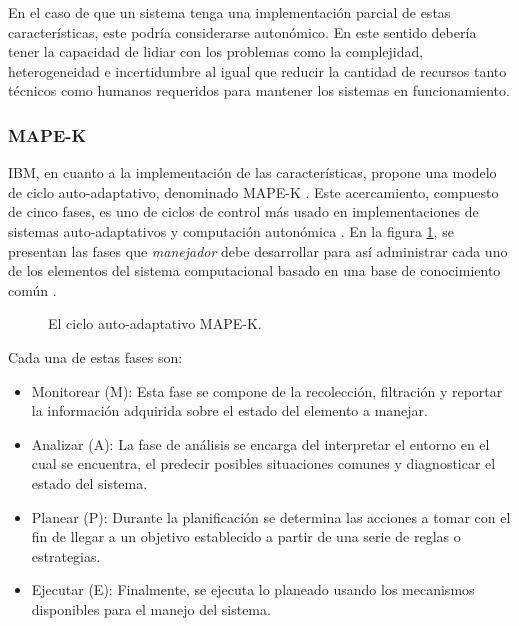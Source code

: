 \documentclass[12pt]{article}
\begin{document}
    En el caso de que un sistema tenga una implementación parcial de estas características, este podría considerarse autonómico. En este sentido debería tener la capacidad de lidiar con los problemas como la complejidad, heterogeneidad e incertidumbre \cite{emerging_2005} al igual que reducir la cantidad de recursos tanto técnicos como humanos requeridos para mantener los sistemas en funcionamiento.
    
    \subsubsection*{MAPE-K}


    IBM, en cuanto a la implementación de las características, propone una modelo de ciclo auto-adaptativo, denominado MAPE-K \cite{Krikava2013}. Este acercamiento, compuesto de cinco fases, es uno de ciclos de control más usado en implementaciones de sistemas auto-adaptativos y computación autonómica \cite{Arcaini_2015}. En la figura \ref{fig:mapek}, se presentan las fases que \textit{manejador} debe desarrollar para así administrar cada uno de los elementos del sistema computacional basado en una base de conocimiento común \cite{alessandra_2010}. 

    \begin{figure}[H]
        \centering
        
        \caption{El ciclo auto-adaptativo MAPE-K.} \cite{alessandra_2010}
        \label{fig:mapek}
    \end{figure}

    Cada una de estas fases son:

    \begin{itemize}
        \item Monitorear (M): Esta fase se compone de la recolección, filtración y reportar la información adquirida sobre el estado del elemento a manejar.
        \item Analizar (A): La fase de análisis se encarga del interpretar el entorno en el cual se encuentra, el predecir posibles situaciones comunes y diagnosticar el estado del sistema.
        \item Planear (P): Durante la planificación se determina las acciones a tomar con el fin de llegar a un objetivo establecido a partir de una serie de reglas o estrategias.
        \item Ejecutar (E): Finalmente, se ejecuta lo planeado usando los mecanismos disponibles para el manejo del sistema. 
    \end{itemize}
\end{document}
